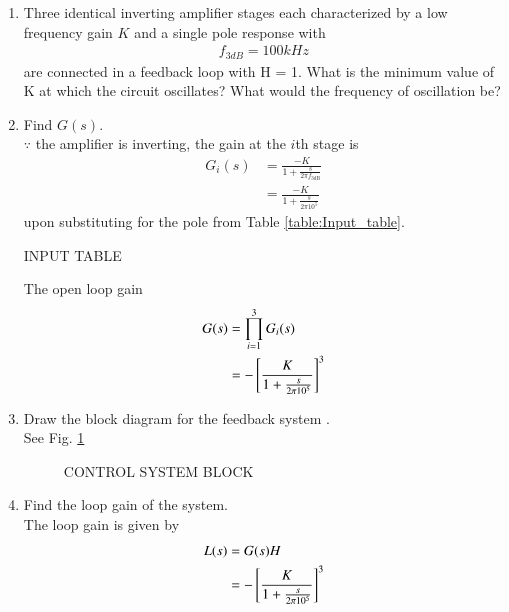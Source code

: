 \begin{enumerate}[label=\arabic*.,ref=\theenumi]
%
\item Three identical inverting amplifier stages each characterized by a low frequency gain $K$ and a single pole response with 
\begin{align}
    f_{3dB} = 100kHz
\end{align}
are connected in a feedback loop with H = 1.
What is the minimum value of K at which the circuit oscillates? What would the frequency of oscillation be?
\item Find $G(s)$.
\\
\solution  $\because$ the amplifier is inverting, the  gain at the $i$th stage is
\begin{align}
    G_i(s) &= \frac{-K}{1+\frac{s}{2\pi f_{3\text{dB}}}}
\\
&=\frac{-K}{1+\frac{s}{2\pi10^5}}
\end{align}
%
upon substituting for the pole from  Table \ref{table:Input_table}.
\begin{table}[!ht]
\centering

\caption{INPUT TABLE}
\label{table:Input_table}
\end{table}
The open loop gain 
\begin{align}
    G(s) &= \prod_{i=1}^{3}G_i(s)
\\
 &= -{}\left[\frac{K}{1+\frac{s}{2\pi10^5}}\right]^3
\end{align}
\item Draw the  block diagram for the feedback system .\\
\solution   See Fig. \ref{fig:ee18btech11031_control_system}
\begin{figure}[!hbt]
	\begin{center}
			\resizebox{\columnwidth}{!}{}
	\end{center}
\caption{CONTROL SYSTEM BLOCK}
\label{fig:ee18btech11031_control_system}
\end{figure}
\item Find the loop gain of the system.\\
\solution The loop gain is given by 
\begin{align}
    L(s) &= G(s)H \\
     &= -{}\left[\frac{K}{1+\frac{s}{2\pi10^5}}\right]^3\\
\label{eq:ee18btech11031_Transfer_Func}
\end{align}


\end{enumerate}
